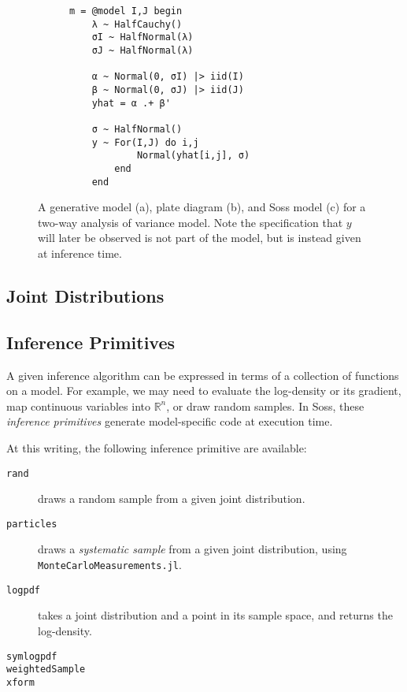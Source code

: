 \documentclass[anonymous=false, %
               format=acmsmall, %
               review=true, %
               screen=true, %
               nonacm=true]{acmart}
\begin{document}
\begin{figure}[t]
\begin{subfigure}[b]{0.3\textwidth}
    \begin{verbatim}
m = @model I,J begin
    λ ~ HalfCauchy()
    σI ~ HalfNormal(λ)
    σJ ~ HalfNormal(λ)
    
    α ~ Normal(0, σI) |> iid(I)
    β ~ Normal(0, σJ) |> iid(J)
    yhat = α .+ β'

    σ ~ HalfNormal()
    y ~ For(I,J) do i,j 
            Normal(yhat[i,j], σ)
        end
    end
    \end{verbatim} 
    \caption{}
    \end{subfigure}

    \caption{A generative model (a), plate diagram (b), and Soss model (c) for a two-way analysis of variance model. Note the specification that $y$ will later be observed is not part of the model, but is instead given at inference time.}
    \label{fig:model}
\end{figure}

\subsection{Joint Distributions}



\subsection{Inference Primitives}

A given inference algorithm can be expressed in terms of a collection of functions on a model. For example, we may need to evaluate the log-density or its gradient, map continuous variables into $\mathbb{R}^n$, or draw random samples. In Soss, these \emph{inference primitives} generate model-specific code at execution time.

At this writing, the following inference primitive are available:


\begin{description}  
    \item[\texttt{rand}] draws a random sample from a given joint distribution.
    \item[\texttt{particles}] draws a \emph{systematic sample} from a given joint distribution, using \texttt{MonteCarloMeasurements.jl}.
    \item[\texttt{logpdf}] takes a joint distribution and a point in its sample space, and returns the log-density.
    \item[\texttt{symlogpdf}] 
    \item[\texttt{weightedSample}] 
    \item[\texttt{xform}] 
\end{description}
\end{document}
